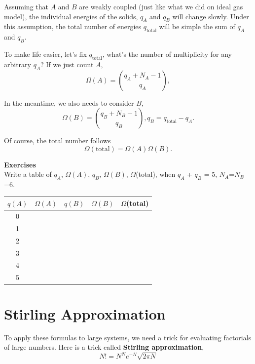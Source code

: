Assuming that $A$ and $B$ are weakly coupled (just like what we did on ideal gas model),
the individual energies of the solids, $q_A$ and $q_B$ will change slowly.
Under this assumption, the total number of energies $q_\text {total}$ will be simple the sum of $q_A$ and $q_B$.

To make life easier, let's fix $q_\text{total}$, what's the number of multiplicity for any arbitrary $q_A$?
If we just count $A$,
\begin{equation}
 \Omega(A) = \binom{q_A+N_A-1}{q_A},
\end{equation}

In the meantime, we also needs to consider $B$, 
\begin{equation}
 \Omega(B) = \binom{q_B+N_B-1}{q_B},
 q_B = q_ \text {total} - q_A.
\end{equation}

Of course, the total number follows
\begin{equation}
 \Omega(\text {total}) = \Omega(A)\Omega(B).
\end{equation}

{\bf Exercises}\\
Write a table of $q_A$, $\Omega(A)$, $q_B$, $\Omega(B)$, $\Omega$(total), when $q_A$ + $q_B$ = 5, $N_A$=$N_B$=6.

\begin{table}[h]
\centering
\begin{tabular}{|c| c |c |c |c|}\hline
$q(A)$ & $\Omega(A)$ & $q(B)$ & $\Omega(B)$ & $\Omega$(total)\\\hline
    0  &             &        &             &  \\\hline
    1  &             &        &             &  \\\hline
    2  &             &        &             &  \\\hline
    3  &             &        &             &  \\\hline
    4  &             &        &             &  \\\hline
    5  &             &        &             &  \\\hline
\end{tabular}
\end{table}

\section{Stirling Approximation}
To apply these formulas to large systems, we need a trick for evaluating factorials of large numbers. Here is a trick called {\bf Stirling approximation},
\begin{equation}\label{stir}
  N! = N^N e^{-N} \sqrt{2\pi N}
\end{equation}

